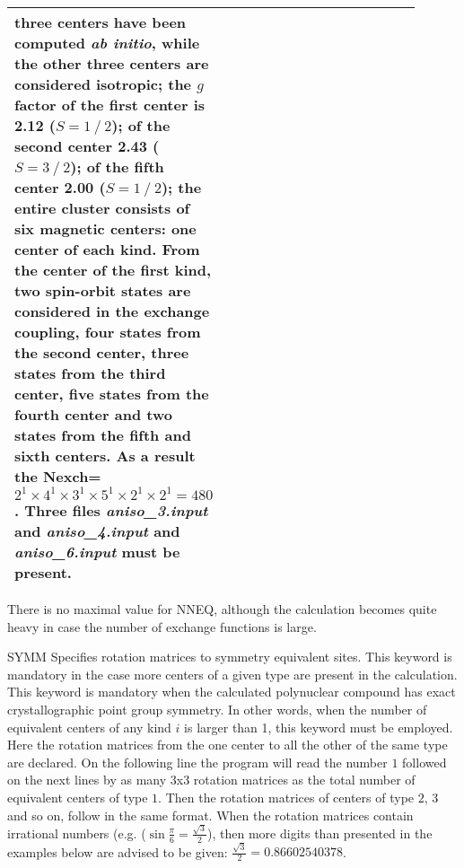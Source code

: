 \begin{keywordlist}
\begin{tabular}{p{0.3\linewidth} p{0.3\linewidth} p{0.3\linewidth}}
{       three centers have been computed \textit{ab initio}, while the other three centers
       are considered isotropic; the $g$ factor of the first center is 2.12 ($S=1⁄2$);
       of the second center 2.43 ($S=3⁄2$); of the fifth center 2.00 ($S=1⁄2$); the entire
       cluster consists of six magnetic centers: one center of each kind. From the center
       of the first kind, two spin-orbit states are considered in the exchange coupling,
       four states from the second center, three states from the third center, five
       states from the fourth center and two states from the fifth and sixth centers.
       As a result the Nexch=$2^1 \times 4^1 \times 3^1 \times 5^1 \times 2^1 \times 2^1=480$.
       Three files \textit {aniso\_3.input} and \textit{aniso\_4.input} and \textit{aniso\_6.input}
       must be present.} \\
\hline
\end{tabular}

There is no maximal value for NNEQ, although the calculation becomes quite heavy in case the number of
exchange functions is large.

\item[SYMM]
Specifies rotation matrices to symmetry equivalent sites. This keyword is mandatory in the case more centers of a given type are present in the calculation.
This keyword is mandatory when the calculated polynuclear compound has exact crystallographic point group symmetry. In other words, when the number of
equivalent centers of any kind $i$ is larger than 1, this keyword must be employed. Here the rotation matrices from the one
center to all the other of the same type are declared.
On the following line the program will read the number $1$ followed on the next lines by as many 3x3 rotation matrices as the total number of
equivalent centers of type $1$. Then the rotation matrices of centers of type $2$, $3$ and so on, follow in the same format.
When the rotation matrices contain irrational numbers (e.g. ($\sin{\frac{\pi}{6}}=\frac{\sqrt{3}}{2}$), then more digits than presented in the examples
below are advised to be given: $\frac{\sqrt{3}}{2}=0.86602540378$.



\end{keywordlist}
